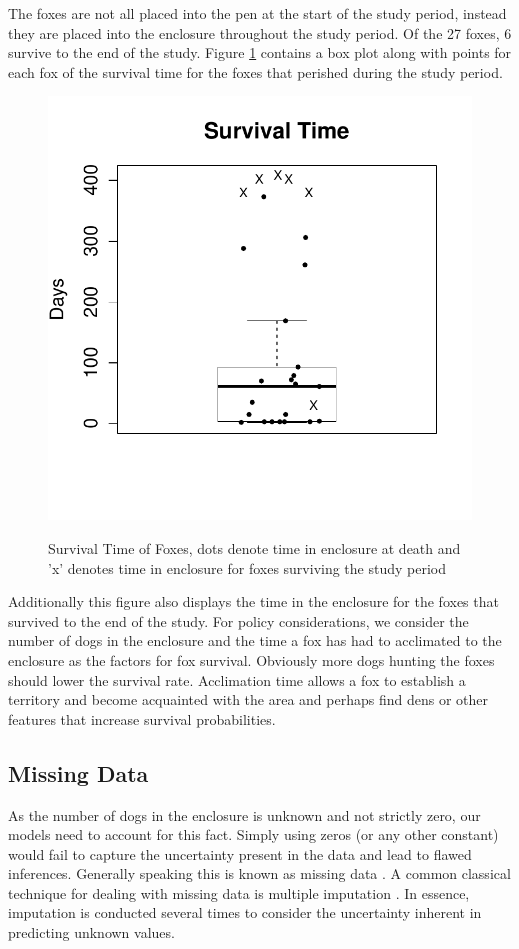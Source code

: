 \documentclass[aoas,preprint]{imsart}
\numberwithin{equation}{section}
\theoremstyle{plain}
\begin{document}
The foxes are not all placed into the pen at the start of the study period, instead they are placed into the enclosure throughout the study period. Of the 27 foxes, 6 survive to the end of the study. Figure \ref{fig:SurvTime} contains a box plot along with points for each fox of the survival time for the foxes that perished during the study period. 
\begin{figure}[h!]
\begin{center}
\caption{Survival Time of Foxes, dots denote time in enclosure at death and 'x' denotes time in enclosure for foxes surviving the study period}
\includegraphics[width=.85\textwidth]{Survival_Time.pdf}
\label{fig:SurvTime}
\end{center}
\end{figure}
Additionally this figure also displays the time in the enclosure for the foxes that survived to the end of the study. For policy considerations, we consider the number of dogs in the enclosure and the time a fox has had to acclimated to the enclosure as the factors for fox survival. Obviously more dogs hunting the foxes should lower the survival rate. Acclimation time allows a fox to establish a territory and become acquainted with the area and perhaps find dens or other features that increase survival probabilities.

\subsection{Missing Data}
As the number of dogs in the enclosure is unknown and not strictly zero, our models need to account for this fact. Simply using zeros (or any other constant) would fail to capture the uncertainty present in the data and lead to flawed inferences. Generally speaking this is known as missing data \citep{little}. A common classical technique for dealing with missing data is multiple imputation \citep{rubin1976,rubin}. In essence, imputation is conducted several times to consider the uncertainty inherent in predicting unknown values.
\end{document}
